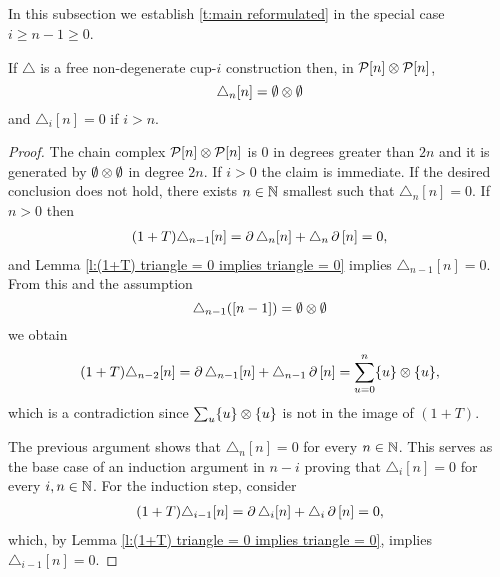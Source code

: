 \subsection{}

In this subsection we establish \cref{t:main reformulated} in the special case $i \geq n-1 \geq 0$.

\begin{lemma}
	If $\triangle$ is a free non-degenerate cup-$i$ construction then, in $\mathcal{P}[n] \otimes \mathcal{P}[n]$,
	\[
	\triangle_n[n] = \emptyset \otimes \emptyset
	\]
	and
	$\triangle_i [n] = 0$ if $i > n$.
\end{lemma}

\begin{proof}
	The chain complex $\mathcal{P}[n] \otimes \mathcal{P}[n]$ is $0$ in degrees greater than $2n$ and it is generated by $\emptyset \otimes \emptyset$ in degree $2n$.
	If $i > 0$ the claim is immediate.
	If the desired conclusion does not hold, there exists $n \in \mathbb{N}$ smallest such that $\triangle_n  [n] = 0$.
	If $n > 0$ then
    \begin{align*}
    (1 + T) \triangle_{n-1} [n] =
    \operatorname{\partial} \triangle_{n} [n] + \triangle_{n} \operatorname{\partial} \, [n] = 0,
    \end{align*}
    and Lemma \ref{l:(1+T) triangle = 0 implies triangle = 0} implies $\triangle_{n-1} [n] = 0$.
	From this and the assumption
    \[
    \triangle_{n-1} ({[n-1]}) = \emptyset \otimes \emptyset
    \]
    we obtain
    \begin{equation}
    \begin{split}
    (1+T)\triangle_{n-2} [n] =
    \operatorname{\partial} \triangle_{n-1} [n] + \triangle_{n-1} \operatorname{\partial} \, [n] =
    \sum_{u = 0}^n \{u\} \otimes \{u\},
    \end{split}
    \end{equation}
 	which is a contradiction since $\sum_u \{u\} \otimes \{u\}$ is not in the image of $(1+T)$.

    The previous argument shows that $\triangle_n [n] = 0$ for every $n \in \mathbb{N}$.
	This serves as the base case of an induction argument in $n-i$ proving that $\triangle_i [n] = 0$ for every $i, n \in \mathbb{N}$.
	For the induction step, consider
    \begin{align*}
    (1+T) \triangle_{i-1} [n] =
    \operatorname{\partial} \triangle_{i} [n] + \triangle_{i} \operatorname{\partial}\, [n] = 0,
    \end{align*}
    which, by Lemma \ref{l:(1+T) triangle = 0 implies triangle = 0}, implies $\triangle_{i-1}  [n] = 0$.
\end{proof}


